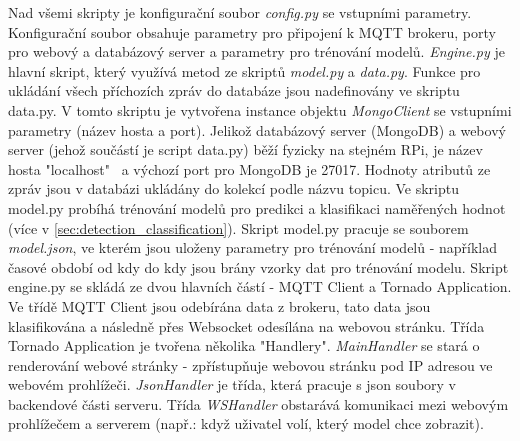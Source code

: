 Nad všemi skripty je konfigurační soubor \textit{config.py} se vstupními parametry. Konfigurační soubor obsahuje parametry pro připojení k MQTT brokeru, porty pro webový a databázový server a parametry pro trénování modelů. \textit{Engine.py} je hlavní skript, který využívá metod ze skriptů \textit{model.py} a \textit{data.py}. Funkce pro ukládání všech příchozích zpráv do databáze jsou nadefinovány ve skriptu data.py. V tomto skriptu je vytvořena instance objektu \textit{MongoClient} se vstupními parametry (název hosta a port). Jelikož databázový server (MongoDB) a webový server (jehož součástí je script data.py) běží fyzicky na stejném RPi, je název hosta "localhost" \ a výchozí port pro MongoDB je 27017. Hodnoty atributů ze zpráv jsou v databázi ukládány do kolekcí podle názvu topicu. Ve skriptu model.py probíhá trénování modelů pro predikci a klasifikaci naměřených hodnot (více v \cref{sec:detection_classification}). Skript model.py pracuje se souborem \textit{model.json}, ve kterém jsou uloženy parametry pro trénování modelů - například časové období od kdy do kdy jsou brány vzorky dat pro trénování modelu. Skript engine.py se skládá ze dvou hlavních částí - MQTT Client a Tornado Application. Ve třídě MQTT Client jsou odebírána data z brokeru, tato data jsou klasifikována a následně přes Websocket odesílána na webovou stránku. Třída Tornado Application je tvořena několika "Handlery". \textit{MainHandler} se stará o renderování webové stránky - zpřístupňuje webovou stránku pod IP adresou ve webovém prohlížeči. \textit{JsonHandler} je třída, která pracuje s json soubory v backendové části serveru. Třída \textit{WSHandler} obstarává komunikaci mezi webovým prohlížečem a serverem (např.: když uživatel volí, který model chce zobrazit).

